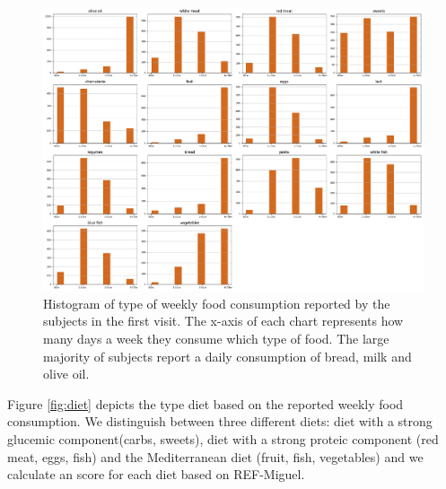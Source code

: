 \documentclass[11pt]{article}
\theoremstyle{definition}
\theoremstyle{remark}
\begin{document}
\begin{figure}[H]
        \centering
        \includegraphics[keepaspectratio, width=\linewidth]{figures/Fig_food}
        \caption{Histogram of type of weekly food consumption reported by the subjects in the first visit. The x-axis of each chart represents how many days a week they consume which type of food. The large majority of subjects report a daily consumption of bread, milk and olive oil.}
        \label{fig:food}
\end{figure}

Figure \ref{fig:diet} depicts the type diet based on the reported weekly food consumption. We distinguish between three different diets: diet with a strong glucemic component(carbs, sweets), diet with a strong proteic component (red meat, eggs, fish) and the Mediterranean diet (fruit, fish, vegetables) and we calculate an score for each diet based on REF-Miguel.
\end{document}
